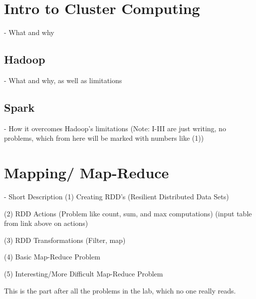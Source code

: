 \documentclass[nociteref]{SIAM-GH-book}
\begin{document}
\label{lab:rivercrossing}
\section{Intro to Cluster Computing}
   - What and why
\subsection*{Hadoop}
   - What and why, as well as limitations
\subsection*{Spark}
   - How it overcomes Hadoop's limitations
(Note: I-III are just writing, no problems, which from here will be marked with numbers like (1))
\section{Mapping/ Map-Reduce}
   - Short Description
   (1) Creating RDD's (Resilient Distributed Data Sets)

   (2) RDD Actions (Problem like count, sum, and max computations)
   (input table from link above on actions)

   (3) RDD Transformations (Filter, map)
\begin{problem}
   (4) Basic Map-Reduce Problem
\end{problem}
\begin{problem}
   (5) Interesting/More Difficult Map-Reduce Problem
\end{problem}

This is the part after all the problems in the lab, which no one really reads.
\end{document}
